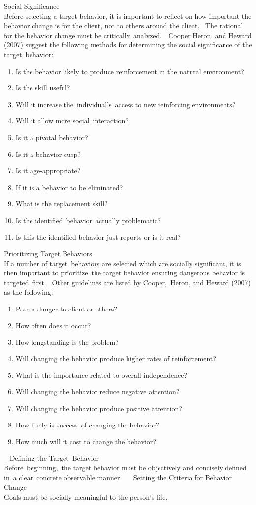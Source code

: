 Social Significance\\
Before selecting a target behavior, it is important to reflect on how important the behavior change is for the client, not to others around the client.  The rational for the behavior change must be critically analyzed.  Cooper Heron, and Heward (2007) suggest the following methods for determining the social significance of the target behavior: 
\begin{enumerate}
\item Is the behavior likely to produce reinforcement in the natural environment?
\item Is the skill useful?
\item Will it increase the individual's access to new reinforcing environments?
\item Will it allow more social interaction? 
\item Is it a pivotal behavior?  
\item Is it a behavior cusp?
\item Is it age-appropriate? 
\item If it is a behavior to be eliminated?
\item What is the replacement skill? 
\item Is the identified behavior actually problematic? 
\item Is this the identified behavior just reports or is it real? 
\end{enumerate}

Prioritizing Target Behaviors\\
If a number of target behaviors are selected which are socially significant, it is then important to prioritize the target behavior ensuring dangerous behavior is targeted first.  Other guidelines are listed by Cooper, Heron, and Heward (2007) as the following: 
\begin{enumerate}
\item Pose a danger to client or others? 
\item How often does it occur? 
\item How longstanding is the problem? 
\item Will changing the behavior produce higher rates of reinforcement? 
\item What is the importance related to overall independence? 
\item Will changing the behavior reduce negative attention? 
\item Will changing the behavior produce positive attention? 
\item How likely is success of changing the behavior? 
\item How much will it cost to change the behavior? 
\end{enumerate}
 
Defining the Target Behavior\\
Before beginning, the target behavior must be objectively and concisely defined in a clear concrete observable manner. 
 
Setting the Criteria for Behavior Change \\
Goals must be socially meaningful to the person's life.   
%
